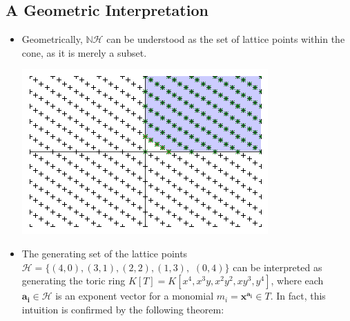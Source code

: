 \documentclass[a0, landscape]{a0poster}
\begin{document}
\begin{multicols}{4}

\subsection*{A Geometric Interpretation}

\begin{itemize}

\item Geometrically, $\mathbb{N}\mathcal{H}$ can be understood as the set of lattice points within the cone, as it is merely a subset.



 \begin{center}
\includegraphics[width=0.7\linewidth]{conezoomout}
\end{center}

\item The generating set of the lattice points 
$\mathcal{H} = \{ (4,0), (3,1), (2,2), (1,3),$ $(0,4) \}$ can be interpreted as generating the toric ring $K[T] = K[x^4, x^3y, x^2y^2, xy^3, y^4]$, where each $\mathbf{a_i} \in \mathcal{H}$ is an exponent vector for a monomial $m_i = \mathbf{x}^\mathbf{a_i} \in T$. In fact, this intuition is confirmed by the following theorem: 


\end{itemize}
\end{multicols}
\end{document}
